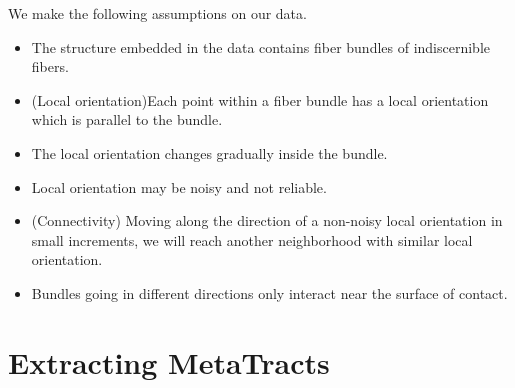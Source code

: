 We make the following assumptions on our data.
\begin{itemize}
\item The structure embedded in the data contains fiber bundles  of indiscernible fibers.
\item (Local orientation)Each point within a fiber  bundle has a local orientation which is parallel to the bundle.
\item The local orientation changes gradually inside the bundle.
\item Local orientation may be noisy and not reliable.
\item (Connectivity) Moving along the direction of a non-noisy local orientation in small increments, we will reach another neighborhood with similar local orientation.
\item Bundles going in different directions only interact near the surface of contact.
\end{itemize}



\section {Extracting MetaTracts }
\label{sec:approach}

